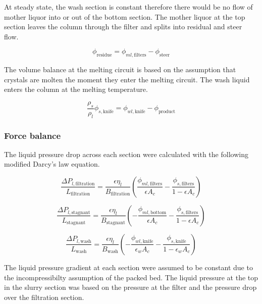 At steady state, the wash section is constant therefore there  would be no flow of mother liquor into or out of the bottom section. The mother liquor at the top section leaves the column through the filter and splits into residual and steer flow. 

\begin{equation}
\phi_{\mathrm{residue}}= \phi_{ml,\mathrm{filters}} - \phi_{\mathrm{steer}}
\end{equation}

The volume balance at the melting circuit is based on the assumption that crystals are molten the moment they enter the melting circuit. The wash liquid enters the column at the melting temperature. 

\begin{equation}
\frac{\rho_s}{\rho_l}\phi_{s,\mathrm{knife}}= \phi_{wl,\mathrm{knife}} - \phi_{\mathrm{product}}
\end{equation}


\subsubsection{Force balance}
The liquid pressure drop across each section were calculated with the following modified Darcy's law equation. 

\begin{equation}
\frac{\Delta P_{l,\mathrm{filtration}}}{L_{\mathrm{filtration}}}=\frac{\epsilon \eta_{l}}{B_{\mathrm{filtration}}}\left(\frac{\phi_{ml,\mathrm{filters}}}{\epsilon A_c} - \frac{\phi_{s,\mathrm{filters}}}{1-\epsilon A_c}\right)
\end{equation}

\begin{equation}
\frac{\Delta P_{l,\mathrm{stagnant}}}{L_{\mathrm{stagnant}}}=\frac{\epsilon \eta_{l}}{B_{\mathrm{stagnant}}}\left(-\frac{\phi_{ml,\mathrm{bottom}}}{\epsilon A_c} - \frac{\phi_{s,\mathrm{filters}}}{1-\epsilon A_c}\right)
\end{equation}

\begin{equation}
\frac{\Delta P_{l,\mathrm{wash}}}{L_{\mathrm{wash}}}=\frac{\epsilon \eta_{l}}{B_{\mathrm{wash}}}\left(-\frac{\phi_{wl,\mathrm{knife}}}{\epsilon_w A_c} - \frac{\phi_{s,\mathrm{knife}}}{1-\epsilon_w A_c}\right)
\end{equation}

The liquid pressure gradient at each section were assumed to be constant due to the incompressibilty assumption of the packed bed. The liquid pressure at the top in the slurry section was based on the pressure at the filter and the pressure drop over the filtration section. 

